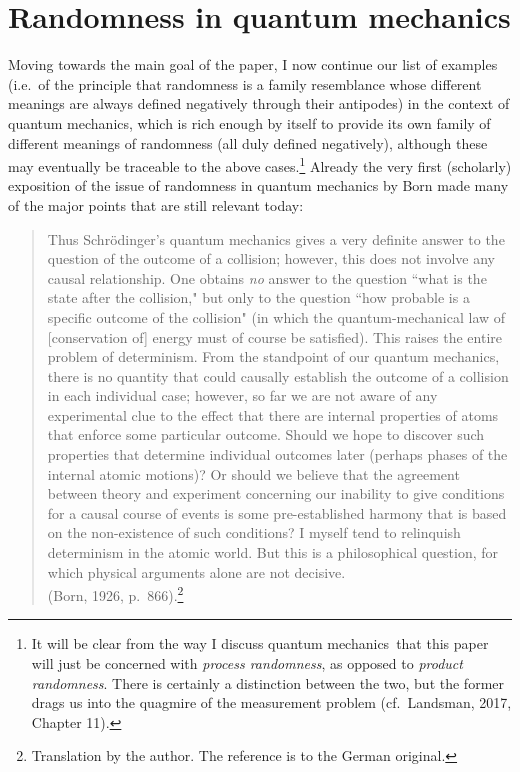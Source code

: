 \documentclass[11pt,a4paper]{article}
\numberwithin{equation}{section}
\newcommand{\qm}{quantum mechanics}
\begin{document}
    \section{Randomness in quantum mechanics}\label{RQM}
    Moving towards the main goal of the paper, I now continue our list of  examples (i.e.\ of the principle that randomness is a family resemblance whose different meanings are always defined negatively through their antipodes) in the context of quantum mechanics, which is rich enough by itself to provide its own family of different meanings of 
 randomness (all duly defined negatively), although these may eventually be traceable to the above cases.\footnote{ \label{fnpp}It will be clear from the way I discuss  \qm\ that this paper will just be concerned with \emph{process randomness}, as opposed to \emph{product randomness}. There is certainly a distinction between the two, but the former  drags  us into the quagmire of the measurement problem (cf.\ Landsman, 2017, Chapter 11).}
 Already the very first (scholarly) exposition of the issue of randomness in quantum mechanics by Born made many of the major points that are still relevant today:
 \begin{quote}\begin{small}
Thus Schr\"{o}dinger's quantum mechanics gives  a  very definite answer to the 
question of  the  outcome  of  a  collision;  however, this does not involve any  causal  relationship.   One obtains 
\emph{no} answer  to  the  question  ``what  is  the  state  after  the  collision,"
but only to the question ``how probable is a specific outcome
 of the collision" (in which the quantum-mechanical law of [conservation of] energy must of course be satisfied). 
This raises the entire problem of determinism.  From the standpoint of our quantum 
mechanics, there is no quantity that could causally establish the outcome of a collision  
in each individual case;  however,  so far we are not aware of any experimental clue to the effect 
that there are  internal  properties  of  atoms  that enforce some particular outcome.  Should we hope to discover such properties that determine individual outcomes later
(perhaps phases of the internal  atomic  motions)?  Or should  we  believe  that  the agreement  between  theory  and  experiment concerning our  inability  to give  conditions for 
a causal course of events is some pre-established harmony that is based on the non-existence of
such conditions? I myself tend to relinquish determinism in the atomic world. But this is a philosophical question, for which physical arguments alone are not decisive. \\ (Born, 1926, p.\ 866).\footnote{Translation by the author. The reference is to the German original.}
\end{small}\end{quote}
\end{document}
